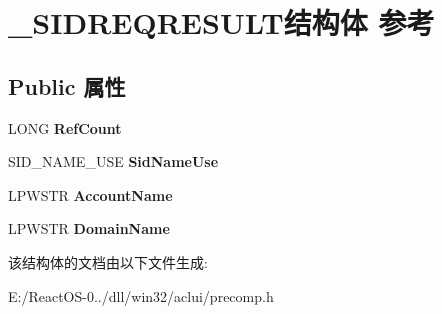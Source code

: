\hypertarget{struct___s_i_d_r_e_q_r_e_s_u_l_t}{}\section{\+\_\+\+S\+I\+D\+R\+E\+Q\+R\+E\+S\+U\+L\+T结构体 参考}
\label{struct___s_i_d_r_e_q_r_e_s_u_l_t}
\subsection*{Public 属性}
\begin{DoxyCompactItemize}
\item 
\mbox{\label{struct___s_i_d_r_e_q_r_e_s_u_l_t_a022ddd4d95a5b62d35235ad401e6e4d1}} 
L\+O\+NG {\bfseries Ref\+Count}
\item 
\mbox{\label{struct___s_i_d_r_e_q_r_e_s_u_l_t_a2c251f57872afe8eb9dd92dbf99cf96b}} 
S\+I\+D\+\_\+\+N\+A\+M\+E\+\_\+\+U\+SE {\bfseries Sid\+Name\+Use}
\item 
\mbox{\label{struct___s_i_d_r_e_q_r_e_s_u_l_t_a1cf3b613a7c5f959d09b15924eca104d}} 
L\+P\+W\+S\+TR {\bfseries Account\+Name}
\item 
\mbox{\label{struct___s_i_d_r_e_q_r_e_s_u_l_t_a4bf7aff6c53103a24cc8506aa352d1f6}} 
L\+P\+W\+S\+TR {\bfseries Domain\+Name}
\end{DoxyCompactItemize}


该结构体的文档由以下文件生成\+:\begin{DoxyCompactItemize}
\item 
E\+:/\+React\+O\+S-\/0../dll/win32/aclui/precomp.\+h\end{DoxyCompactItemize}
